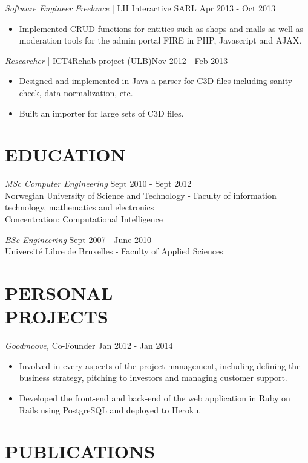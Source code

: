 \documentclass[line, margin]{res}
\begin{document}
\begin{resume}
                {\sl Software Engineer Freelance} | LH Interactive SARL \hfill            Apr 2013 - Oct 2013\\
                 \begin{itemize} %
                  \item Implemented CRUD functions for entities such as shops and malls as well as moderation tools for the admin portal FIRE in PHP, Javascript and AJAX. 
                 \end{itemize} 

                {\sl Researcher} | ICT4Rehab project (ULB)\hfill        Nov 2012 - Feb 2013 \\
                  \begin{itemize}
                   \item Designed and implemented in Java a parser for C3D files including sanity check, data normalization, etc.
                   \item Built an importer for large sets of C3D files.
                  \end{itemize} 

\section{EDUCATION} {\sl MSc Computer Engineering} \hfill   Sept 2010 - Sept 2012 \\
                    Norwegian University of Science and Technology - Faculty of information technology, mathematics and electronics \\
                    Concentration: Computational Intelligence
 
                    {\sl BSc Engineering} \hfill   Sept 2007 - June 2010 \\
                    Université Libre de Bruxelles - Faculty of Applied Sciences
 
 
\section{PERSONAL \\ PROJECTS} {\sl Goodmoove, } Co-Founder \hfill Jan 2012 - Jan 2014 \\
                  \begin{itemize} \itemsep -1pt
                   \item Involved in every aspects of the project management, including defining the business strategy,
                     pitching to investors and managing customer support.
                   \item Developed the front-end and back-end of the web application in Ruby on Rails using PostgreSQL and deployed
                     to Heroku.
                  \end{itemize} 

\section{PUBLICATIONS} 
  \\[5pt]
  \\

\end{resume}
\end{document}
